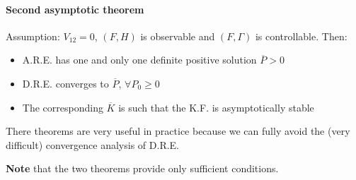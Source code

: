 \paragraph{Second asymptotic theorem}

Assumption: $V_{12} = 0$, $(F, H)$ is observable and $(F, \Gamma)$ is controllable.
Then:
\begin{itemize}
    \item A.R.E. has one and only one definite positive solution $\overline{P} > 0$
    \item D.R.E. converges to $\overline{P}$, $\forall P_0 \ge 0$
    \item The corresponding $\overline{K}$ is such that the K.F. is asymptotically stable
\end{itemize}

There theorems are very useful in practice because we can fully avoid the (very difficult) convergence analysis of D.R.E.

\textbf{Note} that the two theorems provide only sufficient conditions.

